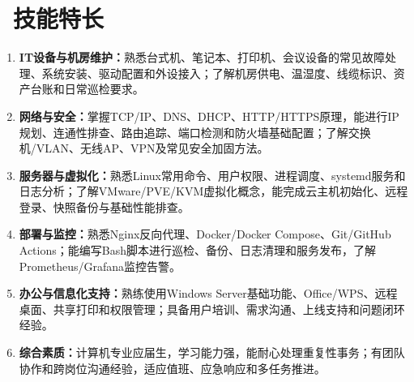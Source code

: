 \documentclass[10pt,a4paper]{ctexart}
\newcommand{\sect}[2]{%
  \section{\texorpdfstring{\makebox[\widthof{\faGraduationCap}][c]{{\mdseries\color{themecolor}#1}}\ #2}{#2}}
}
\begin{document}
\sect{\faWrench}{技能特长}
\begin{enumerate}
  \item \textbf{IT设备与机房维护：}熟悉台式机、笔记本、打印机、会议设备的常见故障处理、系统安装、驱动配置和外设接入；了解机房供电、温湿度、线缆标识、资产台账和日常巡检要求。
  \item \textbf{网络与安全：}掌握TCP/IP、DNS、DHCP、HTTP/HTTPS原理，能进行IP规划、连通性排查、路由追踪、端口检测和防火墙基础配置；了解交换机/VLAN、无线AP、VPN及常见安全加固方法。
  \item \textbf{服务器与虚拟化：}熟悉Linux常用命令、用户权限、进程调度、systemd服务和日志分析；了解VMware/PVE/KVM虚拟化概念，能完成云主机初始化、远程登录、快照备份与基础性能排查。
  \item \textbf{部署与监控：}熟悉Nginx反向代理、Docker/Docker Compose、Git/GitHub Actions；能编写Bash脚本进行巡检、备份、日志清理和服务发布，了解Prometheus/Grafana监控告警。
  \item \textbf{办公与信息化支持：}熟练使用Windows Server基础功能、Office/WPS、远程桌面、共享打印和权限管理；具备用户培训、需求沟通、上线支持和问题闭环经验。
  \item \textbf{综合素质：}计算机专业应届生，学习能力强，能耐心处理重复性事务；有团队协作和跨岗位沟通经验，适应值班、应急响应和多任务推进。
\end{enumerate}
\end{document}
